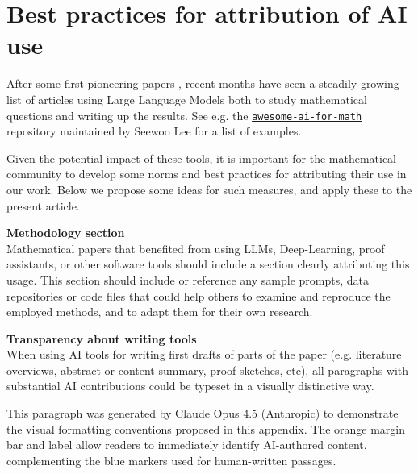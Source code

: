 \documentclass[12pt,reqno]{amsart}
\theoremstyle{definition}
\begin{document}
\section{Best practices for attribution of AI use} \label{sec:AI_attribution}
\begin{humanparagraph}
After some first pioneering papers \cite{ghrist2024latticevaluedbottleneckduality, raz2025euleraiunifyingformulas}, recent months have seen a steadily growing list of articles  \cite{avvakumov2025tensorrankdeterminantperiodic, jang2025pointconvergencenesterovsaccelerated, alexeev2025forbiddensidonsubsetsperfect, ivanisvili2025counterexamplemajorityoptimalitynicd, datar2025complexmongeampereequationapplication, fortnow2025searchversusdecisionmathsfs2mathsfp, dobriban2025solvingresearchproblemmathematical, bubeck2025earlyscienceaccelerationexperiments}  using Large Language Models both to study mathematical questions and writing up the results. {See e.g. the \href{https://github.com/seewoo5/awesome-ai-for-math/blob/main/subjects/llm.md}{\texttt{awesome-ai-for-math}} repository maintained by Seewoo Lee for a list of examples.} 


Given the potential impact of these tools, it is important for the mathematical community to develop some norms and best practices for attributing their use in our work. Below we propose some ideas for such measures, and apply these to the present article. 


\vspace{5pt}
\noindent \textbf{Methodology section}\\
Mathematical papers that benefited from using LLMs, Deep-Learning, proof assistants, or other software tools should include a section clearly attributing this usage. This section should include or reference any sample prompts, data repositories or code files that could help others to examine and reproduce the employed methods, and to adapt them for their own research.

\vspace{5pt}
\noindent \textbf{Transparency about writing tools}\\
When using AI tools for writing first drafts of parts of the paper (e.g. literature overviews, abstract or content summary, proof sketches, etc), all paragraphs with substantial AI contributions could be typeset in a visually distinctive way. 
\end{humanparagraph}
\begin{aiparagraph}
This paragraph was generated by Claude Opus 4.5 (Anthropic) to demonstrate the visual formatting conventions proposed in this appendix. The orange margin bar and label allow readers to immediately identify AI-authored content, complementing the blue markers used for human-written passages.
\end{aiparagraph}
\end{document}
